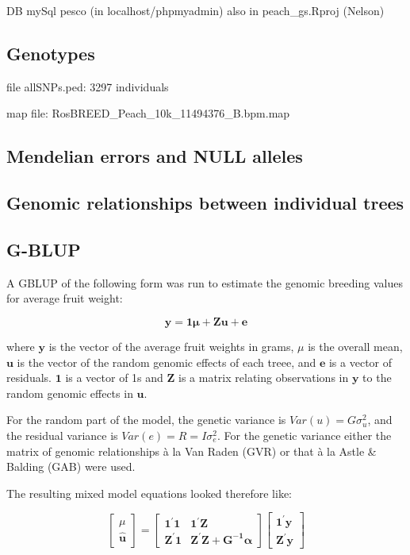 \documentclass[english,11pt,a4paper]{scrartcl}
\begin{document}
DB mySql pesco (in localhost/phpmyadmin)
also in peach_gs.Rproj (Nelson)

\subsection*{Genotypes}

file allSNPs.ped: 3297 individuals 

map file: RosBREED_Peach_10k_11494376_B.bpm.map

\subsection*{Mendelian errors and NULL alleles}

\subsection*{Genomic relationships between individual trees}

%


\subsection*{G-BLUP}
A GBLUP of the following form was run to estimate the genomic breeding
values for average fruit weight:

\begin{equation}
\boldsymbol{y}=\boldsymbol{1\mu}+\boldsymbol{Zu}+\boldsymbol{e}
\end{equation}

where $\boldsymbol{y}$ is the vector of the average fruit weights in
grams, $\mu$ is the overall mean, $\boldsymbol{u}$ is the
vector of the random genomic effects of each treee, and $\boldsymbol{e}$ is a
vector of residuals. $\boldsymbol{1}$ is a vector of 1s and
$\boldsymbol{Z}$ is a matrix relating observations in $\boldsymbol{y}$ to
the random genomic effects in $\boldsymbol{u}$.

For the random part of the model, the genetic variance is
$Var(u)=G\sigma^2_u$, and the residual variance is
$Var(e)=R=I\sigma^2_e$.
For the genetic variance either the matrix of genomic relationships
\`{a} la Van Raden (GVR) or that \`{a} la Astle \& Balding (GAB) were used. 

The resulting mixed model equations looked therefore like:

\begin{equation}
\begin{bmatrix}
\mu \\
\boldsymbol{\hat{u}}
\end{bmatrix}
=
\begin{bmatrix}
\boldsymbol{1^\prime}\boldsymbol{1} & \boldsymbol{1^\prime}\boldsymbol{Z} \\
\boldsymbol{Z^\prime}\boldsymbol{1} & \boldsymbol{Z^\prime}\boldsymbol{Z}+\boldsymbol{G^{-1}\alpha}
\end{bmatrix}
\begin{bmatrix}
\boldsymbol{1^\prime}\boldsymbol{y} \\
\boldsymbol{Z^\prime}\boldsymbol{y}
\end{bmatrix}
\end{equation}
\end{document}
